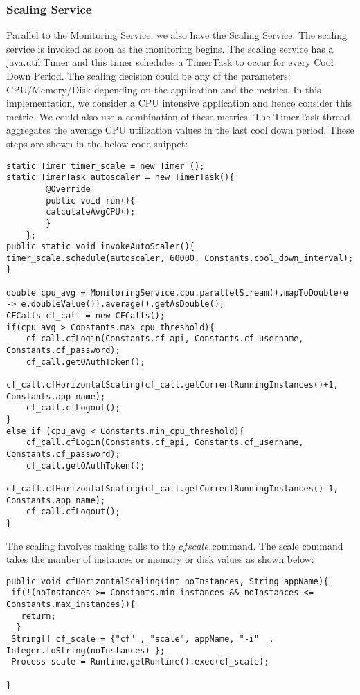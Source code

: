 \documentclass[article,type=msc,colorback,12pt,accentcolor=tud7b]{tudthesis}
\begin{document}
\subsubsection{Scaling Service}
	
	Parallel to the Monitoring Service, we also have the Scaling Service. The scaling service is invoked as soon as the monitoring begins. The scaling service has a java.util.Timer and this timer schedules a TimerTask to occur for every Cool Down Period. The scaling decision could be any of the parameters: CPU/Memory/Disk depending on the application and the metrics. In this implementation, we consider a CPU intensive application and hence consider this metric. We could also use a combination of these metrics. The TimerTask thread aggregates the average CPU utilization values in the last cool down period. These steps are shown in the below code snippet:
	
\begin{lstlisting}
static Timer timer_scale = new Timer ();
static TimerTask autoscaler = new TimerTask(){
	 	@Override
	 	public void run(){
	 	calculateAvgCPU();
	 	}
 	};
public static void invokeAutoScaler(){
timer_scale.schedule(autoscaler, 60000, Constants.cool_down_interval);
}

double cpu_avg = MonitoringService.cpu.parallelStream().mapToDouble(e -> e.doubleValue()).average().getAsDouble();
CFCalls cf_call = new CFCalls();
if(cpu_avg > Constants.max_cpu_threshold){
	cf_call.cfLogin(Constants.cf_api, Constants.cf_username, Constants.cf_password);
	cf_call.getOAuthToken();
	cf_call.cfHorizontalScaling(cf_call.getCurrentRunningInstances()+1, Constants.app_name);
	cf_call.cfLogout();
}
else if (cpu_avg < Constants.min_cpu_threshold){
	cf_call.cfLogin(Constants.cf_api, Constants.cf_username, Constants.cf_password);
	cf_call.getOAuthToken();
	cf_call.cfHorizontalScaling(cf_call.getCurrentRunningInstances()-1, Constants.app_name);
	cf_call.cfLogout();
}
\end{lstlisting}
	The scaling involves making calls to the $cf scale$ command. The scale command takes the number of instances or memory or disk values as shown below:
	\begin{lstlisting}
public void cfHorizontalScaling(int noInstances, String appName){
 if(!(noInstances >= Constants.min_instances && noInstances <= Constants.max_instances)){
   return;
  }
 String[] cf_scale = {"cf" , "scale", appName, "-i"  , Integer.toString(noInstances) };
 Process scale = Runtime.getRuntime().exec(cf_scale);

}	
	\end{lstlisting}
	
\end{document}
